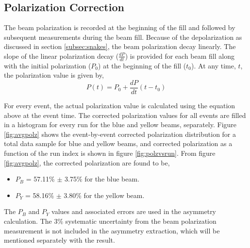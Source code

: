 \subsection{Polarization Correction}
The beam polarization is recorded at the beginning of the fill and followed by subsequent measurements during the beam fill. Because of the depolarization as discussed in section \ref{subsec:snakes}, the beam polarization decay linearly. The slope of the linear polarization decay ($\frac{dP}{dt}$) is provided for each beam fill along with the initial polarization ($P_0$) at the beginning of the fill ($t_0$). At any time, $t$, the polarization value is given by, 
\begin{equation}
    P(t) = P_0 + \frac{dP}{dt} (t-t_0)
    \label{eq:pozdecay}
\end{equation}


For every event, the actual polarization value is calculated using the equation above at the event time. The corrected polarization values for all events are filled in a histogram for every run for the blue and yellow beams, separately. Figure \ref{fig:avgpolz} shows the event-by-event corrected polarization distribution for a total data sample for blue and yellow beams, and corrected polarization as a function of the run index is shown in figure \ref{fig:polzvsrun}. From figure \ref{fig:avgpolz}, the corrected polarization are found to be, 
    \begin{itemize}
        \item $P_B$ = 57.11\% $\pm$ 3.75\% for the blue beam.
        \item $P_Y$ = 58.16\% $\pm$ 3.80\% for the yellow beam.
    \end{itemize}
The $P_B$ and $P_Y$ values and associated errors are used in the asymmetry calculation. The 3\%  systematic uncertainty from the beam polarization measurement is not included in the asymmetry extraction, which will be mentioned separately with the result.      


